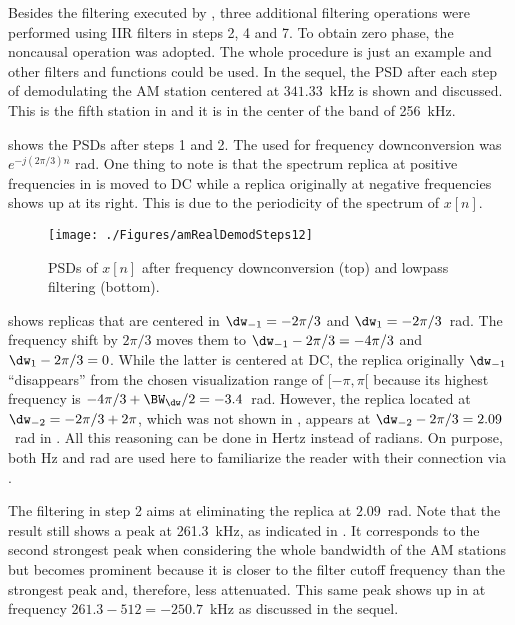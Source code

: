Besides the filtering executed by , three additional filtering operations
were performed using IIR filters in steps 2, 4 and 7. To obtain zero phase, 
the noncausal  operation was adopted. The whole procedure is just an example
and other filters and functions could be used.
In the sequel, the PSD after each step of demodulating the AM station centered at
$341.33$~kHz is shown and discussed. This is the fifth station in  and it is in the center of the band of 256~kHz.

 shows the PSDs after steps 1 and 2. The  used for frequency
downconversion was $e^{-j (2\pi/3) n}$ rad. One thing to note is that the spectrum replica at
positive frequencies in  is moved to DC while a replica originally at
negative frequencies shows up at its right. This is due to the periodicity of the spectrum of $x[n]$. 

\begin{figure}[htbp]
\centering
\texttt{[image: ./Figures/amRealDemodSteps12]}
\caption{PSDs of $x[n]$ after frequency downconversion (top) and
lowpass filtering (bottom).\label{fig:amRealDemodSteps12}}
\end{figure}

 shows replicas that are centered in $\dw_{-1}=-2\pi/3$ and $\dw_{1}=-2\pi/3$~rad. 
The frequency shift by $2\pi/3$ moves them to $\dw_{-1}-2\pi/3=-4\pi/3$ and $\dw_{1}-2\pi/3=0$.
While the latter is centered at DC, the replica originally $\dw_{-1}$ ``disappears'' from the chosen
visualization range of $[-\pi,\pi[$ because its highest frequency is $-4\pi/3+\BW_{\dw}/2=-3.4$~rad.
However, the replica located at $\dw_{-2}=-2\pi/3+2\pi$, which was not shown in , appears at $\dw_{-2}-2\pi/3 = 2.09$~rad in .
All this reasoning can be done in Hertz instead of radians. On purpose, both Hz and rad are
used here to familiarize the reader with their connection via .

The filtering in step 2 aims at eliminating the replica at $2.09$~rad. Note that the result still
shows a peak at 261.3~kHz, as indicated in . It corresponds to the second
strongest peak when considering the whole bandwidth of the AM stations but becomes prominent
because it is closer to the filter cutoff frequency than the strongest peak and, therefore,
less attenuated.
This same peak shows up in  at frequency $261.3-512=-250.7$~kHz as discussed in the sequel. 

